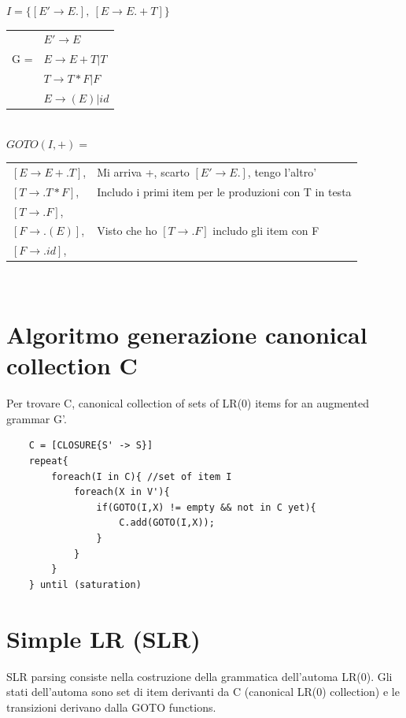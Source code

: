 $ I = \{ [E' \rightarrow E.],\ [E \rightarrow E. +T] \}$
\begin{tabular}{|ll}
        &   $E' \rightarrow E$\\
   G =  &    $E \rightarrow E + T| T$\\
        &   $T \rightarrow T * F | F$\\
        &   $E \rightarrow (E)|id$\\
\end{tabular}\\[10pt]


$GOTO(I, +) = $
\begin{tabular}{|ll|}
    $[E \rightarrow E + .T]$,   &   Mi arriva +, scarto $[E' \rightarrow E.]$, tengo l'altro'    \\
    $[T \rightarrow .T * F]$,   &   Includo i primi item per le produzioni con T in testa    \\
    $[T \rightarrow .F]$,       &       \\
    $[F \rightarrow .(E)]$,     &   Visto che ho $[T \rightarrow .F]$ includo gli item con F\\
    $[F \rightarrow .id]$,      &       \\
\end{tabular}\\[10pt]

\section{Algoritmo generazione canonical collection C}

Per trovare C, canonical collection of sets of LR(0) items for an augmented grammar G'.

\begin{lstlisting}
    C = [CLOSURE{S' -> S}]
    repeat{
        foreach(I in C){ //set of item I 
            foreach(X in V'){
                if(GOTO(I,X) != empty && not in C yet){
                    C.add(GOTO(I,X));
                }
            }
        }
    } until (saturation)
\end{lstlisting}

\section{Simple LR (SLR)}
SLR parsing consiste nella costruzione della grammatica dell'automa LR(0). Gli stati dell'automa sono set di item derivanti 
da C (canonical LR(0) collection) e le transizioni derivano dalla GOTO functions.

